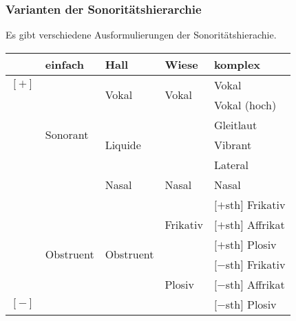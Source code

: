 \begin{frame}
\frametitle{Varianten der Sonoritätshierarchie}

Es gibt verschiedene Ausformulierungen der Sonoritätshierachie.


\begin{table}
\centering
\begin{tabular}{l|l|l|l|l} 
	 & einfach 				  	 & Hall 					  & \textbf{Wiese} 				& komplex  \\ 
\hline
\hline 
$[+]$& \multirow{6}{*}{Sonorant} & \multirow{2}{*}{Vokal} 	  & \multirow{2}{*}{Vokal} 		& Vokal  \\ 
	 & 							 & 						 	  &								& Vokal (hoch) \\
\cline{3-5}			
	 &							 & \multirow{3}{*}{Liquide}   &								& Gleitlaut \\
	 &						  	 &	 						  & \textipa{/\textscr /}		& Vibrant \\
\cline{4-5}			
	 &						 	 &							  & \textipa{/l/}				& Lateral \\
\cline{3-5}			
	 &							 & Nasal					  & Nasal						& Nasal \\
\hline			
	 &\multirow{6}{*}{Obstruent} & \multirow{6}{*}{Obstruent} & \multirow{3}{*}{Frikativ}	& $[+$sth$]$ Frikativ \\
	 &						 	 &							  &								& $[+$sth$]$ Affrikat \\		
	 &							 &							  &								& $[+$sth$]$ Plosiv \\
\cline{4-5}			
	 &						  	 &							  & \multirow{3}{*}{Plosiv}		& $[-$sth$]$ Frikativ \\
	 &						 	 &							  &								& $[-$sth$]$ Affrikat \\		
$[-]$&							 &							  &								& $[-$sth$]$ Plosiv \\
		
\end{tabular} 

\end{table}

\end{frame}




